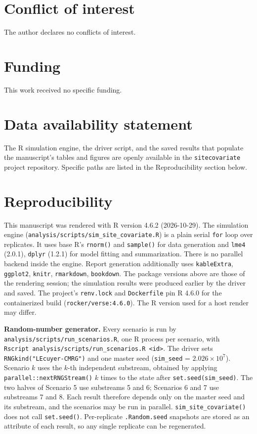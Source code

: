 \documentclass[
  11pt,
]{article}
\begin{document}
\section{Conflict of interest}\label{conflict-of-interest}

The author declares no conflicts of interest.

\section{Funding}\label{funding}

This work received no specific funding.

\section{Data availability statement}\label{data-availability-statement}

The R simulation engine, the driver script, and the saved results
that populate the manuscript's tables and figures are openly
available in the \texttt{sitecovariate} project repository. Specific paths
are listed in the Reproducibility section below.

\section{Reproducibility}\label{reproducibility}

This manuscript was rendered with R version 4.6.2 (2026-10-29). The
simulation engine (\texttt{analysis/scripts/sim\_site\_covariate.R}) is a
plain serial \texttt{for} loop over replicates. It uses base R's \texttt{rnorm()}
and \texttt{sample()} for data generation and \texttt{lme4} (2.0.1), \texttt{dplyr} (1.2.1) for model
fitting and summarization. There is no parallel backend inside the
engine. Report generation additionally uses \texttt{kableExtra}, \texttt{ggplot2}, \texttt{knitr}, \texttt{rmarkdown}, \texttt{bookdown}. The
package versions above are those of the rendering session; the
simulation results were produced earlier by the driver and saved.
The project's \texttt{renv.lock} and \texttt{Dockerfile} pin R 4.6.0 for the
containerized build (\texttt{rocker/verse:4.6.0}). The R version used for
a host render may differ.

\textbf{Random-number generator.} Every scenario is run by
\texttt{analysis/scripts/run\_scenarios.R}, one R process per scenario,
with \texttt{Rscript\ analysis/scripts/run\_scenarios.R\ \textless{}id\textgreater{}}. The driver
sets \texttt{RNGkind("L\textquotesingle{}Ecuyer-CMRG")} and one master seed
(\texttt{sim\_seed} = \ensuremath{2.026\times 10^{7}}). Scenario \(k\) uses the \(k\)-th
independent substream, obtained by applying
\texttt{parallel::nextRNGStream()} \(k\) times to the state after
\texttt{set.seed(sim\_seed)}. The two halves of Scenario 5 use substreams
5 and 6; Scenarios 6 and 7 use substreams 7 and 8. Each result
therefore depends only on the master seed and its substream, and
the scenarios may be run in parallel. \texttt{sim\_site\_covariate()} does
not call \texttt{set.seed()}. Per-replicate \texttt{.Random.seed} snapshots are
stored as an attribute of each result, so any single replicate can
be regenerated.
\end{document}
